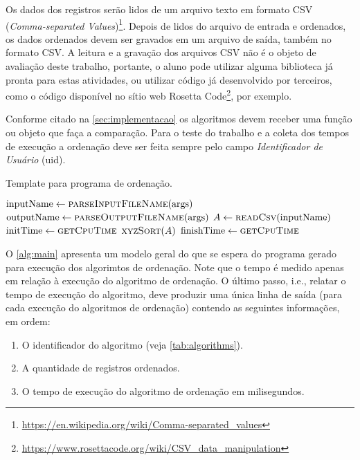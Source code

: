 \documentclass[a4paper,12pt]{scrartcl}
\begin{document}
Os dados dos registros serão lidos de um arquivo texto em formato CSV
(\emph{Comma-separated
  Values})\footnote{\url{https://en.wikipedia.org/wiki/Comma-separated_values}}.
Depois de lidos do arquivo de entrada e ordenados, os dados ordenados devem ser
gravados em um arquivo de saída, também no formato CSV. A leitura e a gravação
dos arquivos CSV não é o objeto de avaliação deste trabalho, portante, o aluno
pode utilizar alguma biblioteca já pronta para estas atividades, ou utilizar
código já desenvolvido por terceiros, como o código disponível no sítio web
Rosetta
Code\footnote{\url{https://www.rosettacode.org/wiki/CSV_data_manipulation}}, por
exemplo.

Conforme citado na \autoref{sec:implementacao} os algoritmos devem receber uma
função ou objeto que faça a comparação. Para o teste do trabalho e a coleta dos
tempos de execução a ordenação deve ser feita sempre pelo campo
\emph{Identificador de Usuário} (uid).


\begin{algorithm}
  \caption{Template para programa de ordenação.}
  \label{alg:main}
  \begin{algorithmic}
    \State $\text{inputName}\gets\Call{parseInputFileName}{\text{args}}$
    \State $\text{outputName}\gets\Call{parseOutputFileName}{\text{args}}$
    \State $A\gets\Call{readCsv}{\text{inputName}}$
    \State $\text{initTime}\gets\Call{getCpuTime}{}$
    \State $\Call{xyzSort}{A}$
    \State $\text{finishTime}\gets\Call{getCpuTime}{}$
    \State {}
    \State {}
\EndProcedure
\end{algorithmic}
\end{algorithm}


O \autoref{alg:main} apresenta um modelo geral do que se espera do programa
gerado para execução dos algorimtos de ordenação. Note que o tempo é medido
apenas em relação à execução do algoritmo de ordenação. O último passo, i.e.,
relatar o tempo de execução do algoritmo, deve produzir uma única linha de saída
(para cada execução do algoritmos de ordenação) contendo as seguintes
informações, em ordem:

\begin{enumerate}
\item O identificador do algoritmo (veja \autoref{tab:algorithms}).
\item A quantidade de registros ordenados.
\item O tempo de execução do algoritmo de ordenação em milisegundos.
\end{enumerate}
\end{document}
